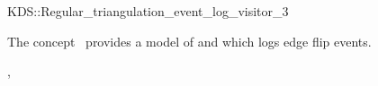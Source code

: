 

\begin{ccRefClass}{KDS::Regular_triangulation_event_log_visitor_3}


\ccDefinition
  
The concept \ccRefName\ provides a model of
 and  which logs edge flip events.


\ccIsModel

, 

\ccSeeAlso



\end{ccRefClass}



